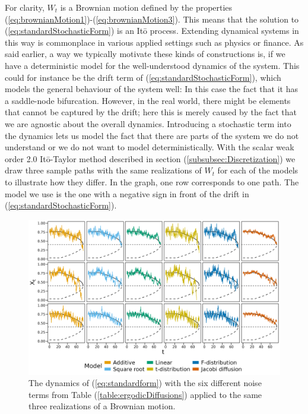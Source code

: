 For clarity, $W_t$ is a Brownian motion defined by the properties (\ref{eq:brownianMotion1})-(\ref{eq:brownianMotion3}). This means that the solution to (\ref{eq:standardStochasticForm}) is an Itō process. Extending dynamical systems in this way is commonplace in various applied settings such as physics or finance. As said earlier, a way we typically motivate these kinds of constructions is, if we have a deterministic model for the well-understood dynamics of the system. This could for instance be the drift term of (\ref{eq:standardStochasticForm}), which models the general behaviour of the system well: In this case the fact that it has a saddle-node bifurcation. However, in the real world, there might be elements that cannot be captured by the drift; here this is merely caused by the fact that we are agnostic about the overall dynamics. Introducing a stochastic term into the dynamics lets us model the fact that there are parts of the system we do not understand or we do not want to model deterministically. \newpage
\noindent With the scalar weak order 2.0 Itō-Taylor method described in section (\ref{subsubsec:Discretization}) we draw three sample paths with the same realizations of $W_t$ for each of the models to illustrate how they differ. In the graph, one row corresponds to one path. The model we use is the one with a negative sign in front of the drift in (\ref{eq:standardStochasticForm}).
\begin{figure}[h]
    \begin{center}
        \includegraphics[scale = .1]{figures/sample_paths_plot_small_scale.jpeg}
        \caption{The dynamics of (\ref{eq:standardform}) with the six different noise terms from Table (\ref{table:ergodicDiffusions}) applied to the same three realizations of a Brownian motion.}
        \label{figure:samplesFromAllDifferentModels}
    \end{center}
\end{figure}\\
